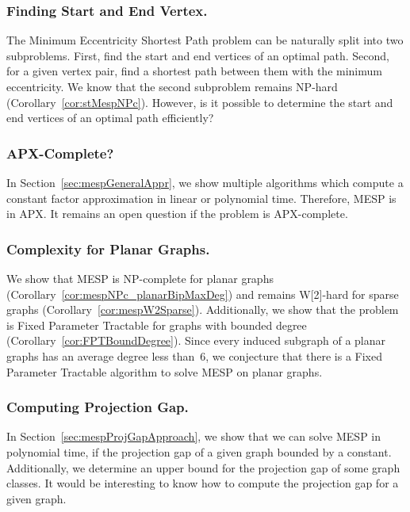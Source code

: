 \subsubsection{Finding Start and End Vertex.}
The Minimum Eccentricity Shortest Path problem can be naturally split into two subproblems.
First, find the start and end vertices of an optimal path.
Second, for a given vertex pair, find a shortest path between them with the minimum eccentricity.
We know that the second subproblem remains NP-hard (Corollary~\ref{cor:stMespNPc}).
However, is it possible to determine the start and end vertices of an optimal path efficiently?

\subsubsection{APX-Complete?}
In Section~\ref{sec:mespGeneralAppr}, we show multiple algorithms which compute a constant factor approximation in linear or polynomial time.
Therefore, MESP is in APX.
It remains an open question if the problem is APX-complete.

\subsubsection{Complexity for Planar Graphs.}
We show that MESP is NP-complete for planar graphs (Corollary~\ref{cor:mespNPc_planarBipMaxDeg}) and remains W[2]-hard for sparse graphs (Corollary~\ref{cor:mespW2Sparse}).
Additionally, we show that the problem is Fixed Parameter Tractable for graphs with bounded degree (Corollary~\ref{cor:FPTBoundDegree}).
Since every induced subgraph of a planar graphs has an average degree less than~$6$, we conjecture that there is a Fixed Parameter Tractable algorithm to solve MESP on planar graphs.

\subsubsection{Computing Projection Gap.}
In Section~\ref{sec:mespProjGapApproach}, we show that we can solve MESP in polynomial time, if the projection gap of a given graph bounded by a constant.
Additionally, we determine an upper bound for the projection gap of some graph classes.
It would be interesting to know how to compute the projection gap for a given graph.
